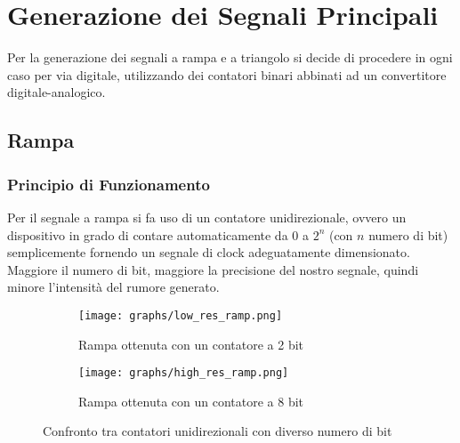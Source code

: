 \chapter{Generazione dei Segnali Principali}\label{segnali_principali}


Per la generazione dei segnali a rampa e a triangolo si decide di procedere in ogni caso
per via digitale, utilizzando dei contatori binari abbinati ad un convertitore
digitale-analogico.


\section{Rampa}


\subsection*{Principio di Funzionamento}


Per il segnale a rampa si fa uso di un contatore unidirezionale, ovvero un dispositivo
in grado di contare automaticamente da $0$ a $2^n$ (con $n$ numero di bit) semplicemente
fornendo un segnale di clock adeguatamente dimensionato. Maggiore il numero di bit,
maggiore la precisione del nostro segnale, quindi minore l'intensità del rumore generato.

\begin{figure}[H]
    \centering

    \begin{subfigure}{.5\textwidth}
        \centering
        \texttt{[image: graphs/low\_res\_ramp.png]}
        \caption{Rampa ottenuta con un contatore a 2 bit}
        \label{low_res_ramp}
    \end{subfigure}%
    \begin{subfigure}{.5\textwidth}
        \centering
        \texttt{[image: graphs/high\_res\_ramp.png]}
        \caption{Rampa ottenuta con un contatore a 8 bit}
        \label{high_res_ramp}
    \end{subfigure}

    \caption{Confronto tra contatori unidirezionali con diverso numero di bit}
    \label{ramps}
\end{figure}

